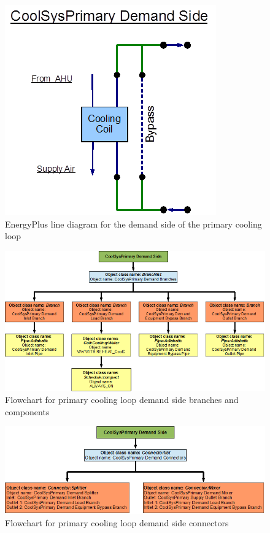 \begin{figure}[htbp] %
\centering
\includegraphics{media/image052.png}
\caption{EnergyPlus line diagram for the demand side of the primary cooling loop \protect \label{fig:energyplus-line-diagram-for-the-demand-side-006}}
\end{figure}

\begin{figure}[htbp] %
\centering
\includegraphics{media/image053.png}
\caption{Flowchart for primary cooling loop demand side branches and components \protect \label{fig:flowchart-for-primary-cooling-loop-demand-side-branches}}
\end{figure}

\begin{figure}[htbp] %
\centering
\includegraphics{media/image054.png}
\caption{Flowchart for primary cooling loop demand side connectors \protect \label{fig:flowchart-for-primary-cooling-loop-demand-side-connectors}}
\end{figure}

